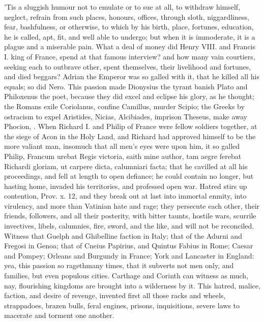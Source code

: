 {'Tis a sluggish humour not to emulate or to sue at all, to withdraw
himself, neglect, refrain from such places, honours, offices, through
sloth, niggardliness, fear, bashfulness, or otherwise, to which by his
birth, place, fortunes, education, he is called, apt, fit, and well
able to undergo; but when it is immoderate, it is a plague and a
miserable pain. What a deal of money did Henry VIII. and Francis I.
king of France, spend at that famous interview? and how many vain
courtiers, seeking each to outbrave other, spent themselves, their
livelihood and fortunes, and died beggars? Adrian the Emperor was
so galled with it, that he killed all his equals; so did Nero. This
passion made Dionysius the tyrant banish Plato and Philoxenus the
poet, because they did excel and eclipse his glory, as he thought; the
Romans exile Coriolanus, confine Camillus, murder Scipio; the Greeks by
ostracism to expel Aristides, Nicias, Alcibiades, imprison Theseus,
make away Phocion, \etc{}. When Richard I. and Philip of France were fellow
soldiers together, at the siege of Acon in the Holy Land, and Richard
had approved himself to be the more valiant man, insomuch that all
men's eyes were upon him, it so galled Philip, Francum urebat Regis
victoria, saith mine author, tam aegre ferebat Richardi gloriam,
ut carpere dicta, calumniari facta; that he cavilled at all his
proceedings, and fell at length to open defiance; he could contain no
longer, but hasting home, invaded his territories, and professed open
war. Hatred stirs up contention, Prov. x. 12, and they break out at
last into immortal enmity, into virulency, and more than Vatinian hate
and rage; they persecute each other, their friends, followers,
and all their posterity, with bitter taunts, hostile wars, scurrile
invectives, libels, calumnies, fire, sword, and the like, and will not
be reconciled. Witness that Guelph and Ghibelline faction in Italy;
that of the Adurni and Fregosi in Genoa; that of Cneius Papirius, and
Quintus Fabius in Rome; Caesar and Pompey; Orleans and Burgundy in
France; York and Lancaster in England: yea, this passion so
ragethmany times, that it subverts not men only, and families,
but even populous cities. Carthage and Corinth can witness as
much, nay, flourishing kingdoms are brought into a wilderness by it.
This hatred, malice, faction, and desire of revenge, invented first all
those racks and wheels, strappadoes, brazen bulls, feral engines,
prisons, inquisitions, severe laws to macerate and torment one another.
}
